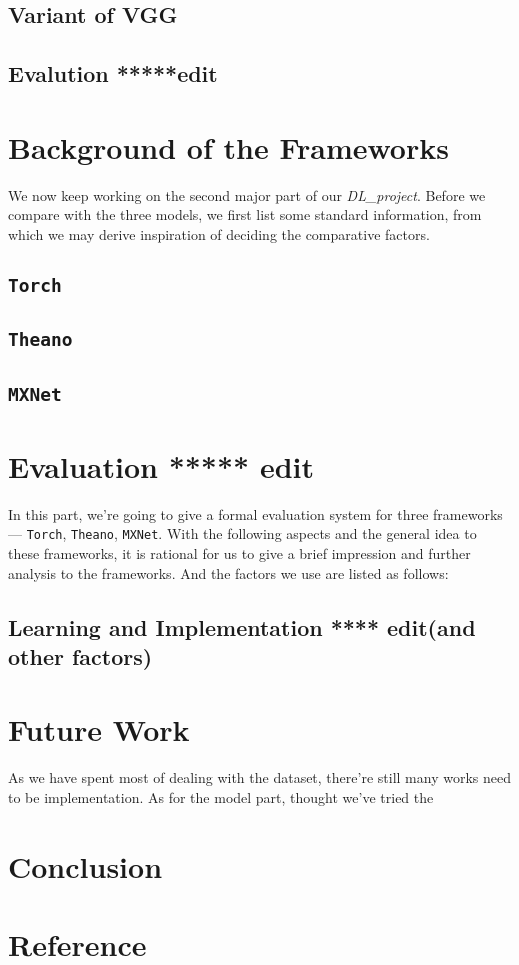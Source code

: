 \documentclass[12pt]{article}
\begin{document}
\subsection{Variant of VGG}

\subsection{Evalution *****edit}




\section{Background of the Frameworks}

We now keep working on the second major part of our {\it DL\_project}. Before we compare with the three models, we first list some standard information, from which we may derive inspiration of deciding the comparative factors.

\subsection{\texttt{Torch}}

\subsection{\texttt{Theano}}

\subsection{\texttt{MXNet\\}}



\section{Evaluation ***** edit}
In this part, we're going to give a formal evaluation system for three frameworks --- \texttt{Torch}, \texttt{Theano}, \texttt{MXNet}. With the following aspects and the general idea to these frameworks, it is rational for us to give a brief impression and further analysis to the frameworks. And the factors we use are listed as follows:
\subsection{Learning and Implementation **** edit(and other factors)}



\section{Future Work}
As we have spent most of dealing with the dataset, there're still many works need to be implementation.
As for the model part, thought we've tried the 

\section{Conclusion}

\section{Reference}
\end{document}
